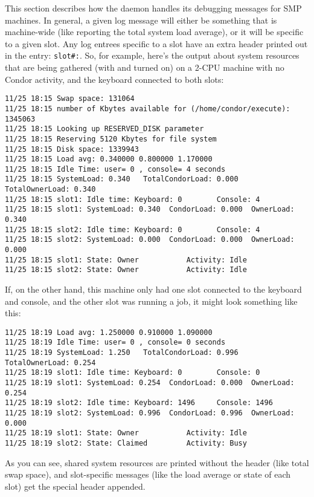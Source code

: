 This section describes how the  daemon
handles its debugging messages for SMP machines.
In general, a given log message will either be something that is
machine-wide (like reporting the total system load average), or it
will be specific to a given slot.
Any log entrees specific to a slot have an extra
header printed out in the entry: \texttt{slot\#:}.  
So, for example, here's the output about system resources that are
being gathered (with  and  turned on) on
a 2-CPU machine with no Condor activity, and the keyboard connected to
both slots:
\begin{verbatim}
11/25 18:15 Swap space: 131064
11/25 18:15 number of Kbytes available for (/home/condor/execute): 1345063
11/25 18:15 Looking up RESERVED_DISK parameter
11/25 18:15 Reserving 5120 Kbytes for file system
11/25 18:15 Disk space: 1339943
11/25 18:15 Load avg: 0.340000 0.800000 1.170000
11/25 18:15 Idle Time: user= 0 , console= 4 seconds
11/25 18:15 SystemLoad: 0.340   TotalCondorLoad: 0.000  TotalOwnerLoad: 0.340
11/25 18:15 slot1: Idle time: Keyboard: 0        Console: 4
11/25 18:15 slot1: SystemLoad: 0.340  CondorLoad: 0.000  OwnerLoad: 0.340
11/25 18:15 slot2: Idle time: Keyboard: 0        Console: 4
11/25 18:15 slot2: SystemLoad: 0.000  CondorLoad: 0.000  OwnerLoad: 0.000
11/25 18:15 slot1: State: Owner           Activity: Idle
11/25 18:15 slot2: State: Owner           Activity: Idle
\end{verbatim}

If, on the other hand, this machine only had one slot
connected to the keyboard and console, and the other slot was running a
job, it might look something like this:
\begin{verbatim}
11/25 18:19 Load avg: 1.250000 0.910000 1.090000
11/25 18:19 Idle Time: user= 0 , console= 0 seconds
11/25 18:19 SystemLoad: 1.250   TotalCondorLoad: 0.996  TotalOwnerLoad: 0.254
11/25 18:19 slot1: Idle time: Keyboard: 0        Console: 0
11/25 18:19 slot1: SystemLoad: 0.254  CondorLoad: 0.000  OwnerLoad: 0.254
11/25 18:19 slot2: Idle time: Keyboard: 1496     Console: 1496
11/25 18:19 slot2: SystemLoad: 0.996  CondorLoad: 0.996  OwnerLoad: 0.000
11/25 18:19 slot1: State: Owner           Activity: Idle
11/25 18:19 slot2: State: Claimed         Activity: Busy
\end{verbatim}

As you can see, shared system resources are printed without the header
(like total swap space), and slot-specific messages (like the load
average or state of each slot) get the special header appended.  


